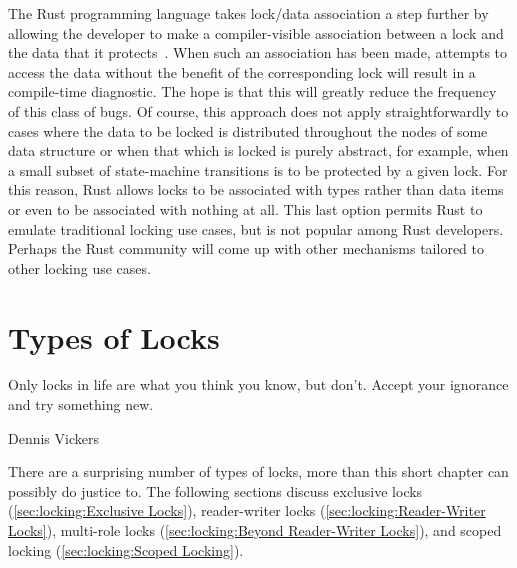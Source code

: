 \QuickQuizEnd

The Rust programming language takes lock/data association a step further
by allowing the developer to make a compiler-visible association between
a lock and the data that it protects~\cite{RalfJung2021RustSafeSysProg}.
When such an association has been made, attempts to access the data
without the benefit of the corresponding lock will result in a
compile-time diagnostic.
The hope is that this will greatly reduce the frequency of this class
of bugs.
Of course, this approach does not apply straightforwardly to cases
where the data to be locked is distributed throughout the nodes of
some data structure or when that which is locked is purely abstract,
for example, when a small subset of state-machine transitions is to
be protected by a given lock.
For this reason, Rust allows locks to be associated with types rather
than data items or even to be associated with nothing at all.
This last option permits Rust to emulate traditional locking use cases,
but is not popular among Rust developers.
Perhaps the Rust community will come up with other mechanisms tailored
to other locking use cases.

\section{Types of Locks}
\label{sec:locking:Types of Locks}
%
\epigraph{Only locks in life are what you think you know, but don't.
	  Accept your ignorance and try something new.}
	 {Dennis Vickers}

There are a surprising number of types of locks, more than this
short chapter can possibly do justice to.
The following sections discuss
exclusive locks (\cref{sec:locking:Exclusive Locks}),
reader-writer locks (\cref{sec:locking:Reader-Writer Locks}),
multi-role locks (\cref{sec:locking:Beyond Reader-Writer Locks}),
and scoped locking (\cref{sec:locking:Scoped Locking}).

